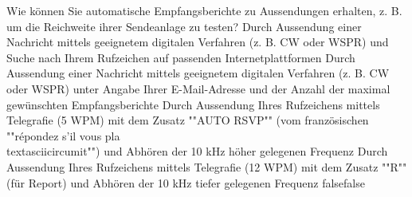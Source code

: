     {Wie können Sie automatische Empfangsberichte zu Aussendungen erhalten, z. B. um die Reichweite ihrer Sendeanlage zu testen?}
    {Durch Aussendung einer Nachricht mittels geeignetem digitalen Verfahren (z. B. CW oder WSPR) und Suche nach Ihrem Rufzeichen auf passenden Internetplattformen}
    {Durch Aussendung einer Nachricht mittels geeignetem digitalen Verfahren (z. B. CW oder WSPR) unter Angabe Ihrer E-Mail-Adresse und der Anzahl der maximal gewünschten Empfangsberichte}
    {Durch Aussendung Ihres Rufzeichens mittels Telegrafie (5 WPM) mit dem Zusatz ""AUTO RSVP"" (vom französischen ""répondez s'il vous pla\\textasciicircum{}it"") und Abhören der 10 kHz höher gelegenen Frequenz}
    {Durch Aussendung Ihres Rufzeichens mittels Telegrafie (12 WPM) mit dem Zusatz ""R"" (für Report) und Abhören der 10 kHz tiefer gelegenen Frequenz}
    {false}{false}